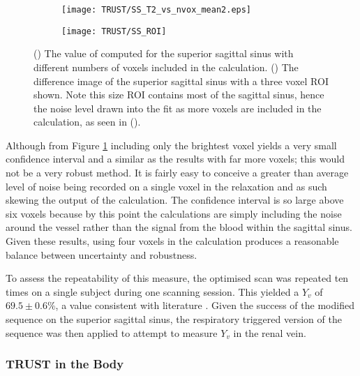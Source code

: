 \begin{figure}[H]
	\centering
	\begin{subfigure}[c]{0.47\textwidth}
		\centering
		\texttt{[image: TRUST/SS\_T2\_vs\_nvox\_mean2.eps]}
		\caption{}
		\label{fig:nvox_SS}
	\end{subfigure}
	\hfill
	\begin{subfigure}[c]{0.47\textwidth}
		\centering
		\texttt{[image: TRUST/SS\_ROI]}
		\caption{}
		\label{fig:SS_ROI}
	\end{subfigure}
	\caption{() The value of \ttwo computed for the superior sagittal sinus with different numbers of voxels included in the calculation. () The difference image of the superior sagittal sinus with a three voxel \ac{ROI} shown. Note this size \ac{ROI} contains most of the sagittal sinus, hence the noise level drawn into the fit as more voxels are included in the calculation, as seen in ().}
	\label{fig:nv_SS}
\end{figure}

Although from Figure \ref{fig:nvox_SS} including only the brightest voxel yields a very small confidence interval and a similar \ttwo as the results with far more voxels; this would not be a very robust method. It is fairly easy to conceive a greater than average level of noise being recorded on a single voxel in the relaxation and as such skewing the output of the calculation. The confidence interval is so large above six voxels because by this point the calculations are simply including the noise around the vessel rather than the signal from the blood within the sagittal sinus. Given these results, using four voxels in the calculation produces a reasonable balance between uncertainty and robustness.

To assess the repeatability of this measure, the optimised scan was repeated ten times on a single subject during one scanning session. This yielded a $Y_v$ of $69.5\pm0.6$\%, a value consistent with literature \cite{nagdyman_comparison_2005, liu_multi-site_2016}. Given the success of the modified sequence on the superior sagittal sinus, the respiratory triggered version of the sequence was then applied to attempt to measure $Y_v$ in the renal vein.

\subsubsection{\ac{TRUST} in the Body}


